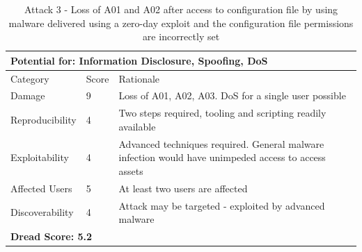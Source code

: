 \documentclass [11pt, proquest] {uwthesis}[2020/02/24]
\begin{document}
\setlength{\belowcaptionskip}{-10pt}
\begin{table}[H]
\begin{tabular}{|m{3cm}|m{.9cm}|p{27em} |}
\multicolumn{3}{l}{Potential for: Information Disclosure, Spoofing, DoS}                   \\
\hline
Category & Score & Rationale \\
\hline
Damage          & 9     & Loss of A01, A02, A03. DoS for a single user possible            \\
\hline
Reproducibility & 4     & Two steps required, tooling and scripting readily available    \\
\hline
Exploitability & 4      & Advanced techniques required. General malware infection would have unimpeded access to access assets  \\
\hline
Affected Users  & 5     & At least two users are affected                      \\
\hline
Discoverability & 4     & Attack may be targeted - exploited by advanced malware \\
\hline
\multicolumn{3}{l}{\textbf{Dread Score: 5.2}} 
\end{tabular}
\caption{Attack 3 - Loss of A01 and A02 after access to configuration file by using malware delivered using a zero-day exploit and the configuration file permissions are incorrectly set}
\setlength{\belowcaptionskip}{-10pt}
\label{ref:attack3}
\end{table}
\end{document}
